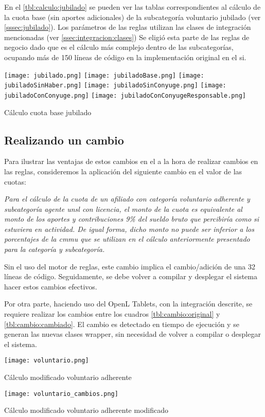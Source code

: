 En el \cref{tbl:calculo:jubilado} se pueden ver las tablas correspondientes al cálculo de la cuota base (sin aportes adicionales) de la subcategoría voluntario jubilado (ver \cref{sssec:jubilado}). Los parámetros de las reglas utilizan las clases de integración mencionadas (ver \cref{ssec:integracion:clases}) Se eligió esta parte de las reglas de negocio dado que es el cálculo más complejo dentro de las subcategorías, ocupando más de 150 líneas de código en la implementación original en el \acrshort{si}.

\begin{table*}
    \centering
    \texttt{[image: jubilado.png]}
    \texttt{[image: jubiladoBase.png]}
    \texttt{[image: jubiladoSinHaber.png]}
    \texttt{[image: jubiladoSinConyuge.png]}
    \texttt{[image: jubiladoConConyuge.png]}
    \texttt{[image: jubiladoConConyugeResponsable.png]}
    \caption{Cálculo cuota base jubilado}
    \label{tbl:calculo:jubilado}
\end{table*}

\subsection{Realizando un cambio}\label{ssec:integracion:cambio}
Para ilustrar las ventajas de estos cambios en el \SIDOSPU a la hora de realizar cambios en las reglas, consideremos la aplicación del siguiente cambio en el valor de las cuotas:

\emph{
Para el cálculo de la cuota de un afiliado con categoría voluntario adherente y subcategoría agente \acrshort{unsl} con licencia, el monto de la cuota es equivalente al monto de los aportes y contribuciones 9\% del sueldo bruto que percibiría como si estuviera en actividad. De igual forma, dicho monto no puede ser inferior a los porcentajes de la \acrshort{cmmu} que se utilizan en el cálculo anteriormente presentado para la categoría y subcategoría.
}

Sin el uso del motor de reglas, este cambio implica el cambio/adición de una 32 líneas de código. Seguidamente, se debe volver a compilar y desplegar el sistema hacer estos cambios efectivos.

Por otra parte, haciendo uso del OpenL Tablets, con la integración descrite, se requiere realizar los cambios entre los cuadros \ref{tbl:cambio:original} y \ref{tbl:cambio:cambiado}. El cambio es detectado en tiempo de ejecución y se generan las nuevas clases wrapper, sin necesidad de volver a compilar o desplegar el sistema.

\begin{table*}
    \centering
    \texttt{[image: voluntario.png]}
    \caption{Cálculo modificado voluntario adherente}
    \label{tbl:cambio:original}
\end{table*}

\begin{table*}
    \centering
    \texttt{[image: voluntario\_cambios.png]}
    \caption{Cálculo modificado voluntario adherente modificado}
    \label{tbl:cambio:cambiado}
\end{table*}
